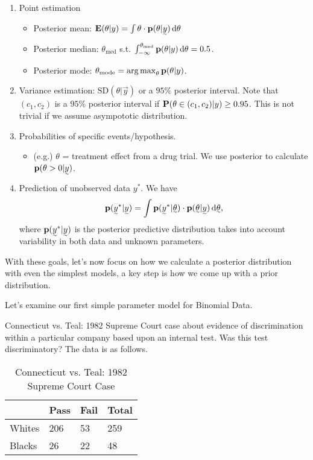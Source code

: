 \begin{enumerate}
    \item Point estimation
    \begin{itemize}
        \item Posterior mean: $\E(\theta| y) = \int \theta \cdot \p(\theta| \vec{y}) \diff \theta$
        \item Posterior median: $\theta_{\text{med}}$ s.t. $\int_{-\infty}^{\theta_{\text{med}}} \p(\theta| y) \diff \theta = 0.5$.
        \item Posterior mode: $\theta_{\text{mode}} = \argmax_{\theta} \p(\theta| y)$.
    \end{itemize}
    \item Variance estimation: $\text{SD}(\theta| \vec{y})$ or a $95\%$ posterior interval. 
    Note that $(c_1, c_2)$ is a $95\%$ posterior interval if $\P(\theta \in (c_1, c_2) | y) \ge 0.95$. This is not trivial if we assume asympototic distribution.
    \item Probabilities of specific events/hypothesis.
    \begin{itemize}
        \item (e.g.) $\theta$ = treatment effect from a drug trial. We use posterior to calculate $\p(\theta>0|\vec{y})$.
    \end{itemize}
    \item Prediction of unobserved data $y^*$. We have
    \[
        \p(\vec{y}^*| \vec{y}) = \int \p(\vec{y}^*| \vec{\theta}) \cdot \p(\vec{\theta}| \vec{y}) \diff \vec{\theta},
    \]
    where $\p(\vec{y}^*| \vec{y})$ is the posterior predictive distribution takes into account variability in both data and unknown parameters.
\end{enumerate}

With these goals, let's now focus on how we calculate a posterior distribution with even the simplest models, a key step is how we come up with a prior distribution.

Let's examine our first simple parameter model for Binomial Data.

Connecticut vs. Teal: 1982 Supreme Court case about evidence of discrimination within a particular company based upon an internal test. Was this test discriminatory? The data is as follows.

\begin{table}[ht]
\centering
\begin{tabular}{@{}llll@{}}
\toprule
       & Pass & Fail & Total \\ \midrule
Whites & 206  & 53   & 259   \\
Blacks & 26   & 22   & 48    \\ \bottomrule
\end{tabular}
\caption{Connecticut vs. Teal: 1982 Supreme Court Case}
\end{table}

